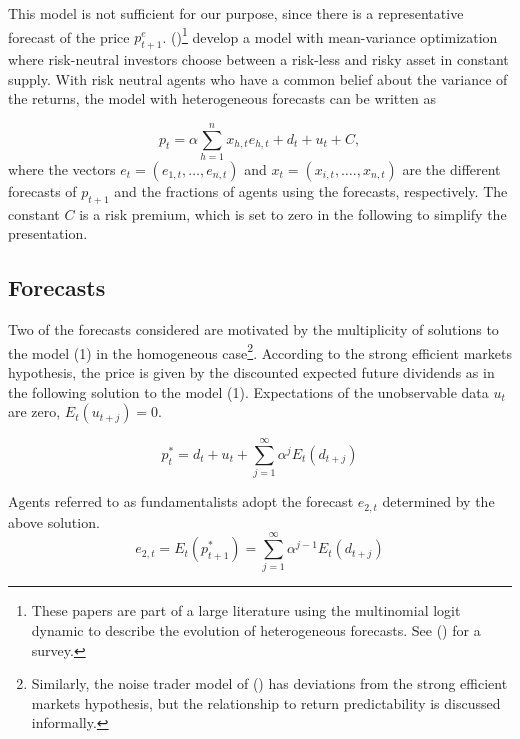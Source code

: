 \documentclass[12pt]{article}
\begin{document}
This model is not sufficient for our purpose, since there is a representative forecast of the price $p_{t+1}^{e}$. \citeauthor{brock1998heterogeneous} (\citeyear{brock1998heterogeneous})\footnote{These papers are part of a large literature using the multinomial logit dynamic to describe the evolution of heterogeneous forecasts. See \citeauthor{hommes2006heterogeneous} (\citeyear{hommes2006heterogeneous}) for a survey.} develop a model with mean-variance optimization where risk-neutral investors choose between a risk-less and risky asset in constant supply. With risk neutral agents who have a common belief about the variance of the returns, the model with heterogeneous forecasts can be written as

\begin{equation}
p_{t}=\alpha \sum_{h=1}^{n} x_{h, t} e_{h, t}+d_{t}+u_{t}+C, \label{p het exp}
\end{equation}
where the vectors $e_{t}=\left(e_{1, t}, \ldots, e_{n, t}\right)$ and $x_{t}=\left(x_{i, t}, \ldots ., x_{n, t}\right)$ are the different forecasts of $p_{t+1}$ and the fractions of agents using the forecasts, respectively. The constant $C$ is a risk premium, which is set to zero in the following to simplify the presentation.

\subsection{Forecasts}

Two of the forecasts considered are motivated by the multiplicity of solutions to the model (1) in the homogeneous case\footnote{Similarly, the noise trader model of \citeauthor{delong1991survival} (\citeyear{delong1991survival}) has deviations from the strong efficient markets hypothesis, but the relationship to return predictability is discussed informally.}. According to the strong efficient markets hypothesis, the price is given by the discounted expected future dividends as in the following solution to the model (1). Expectations of the unobservable data $u_{t}$ are zero, $E_{t}\left(u_{t+j}\right)=0$.

\begin{equation}
p_{t}^{*}=d_{t}+u_{t}+\sum_{j=1}^{\infty} \alpha^{j} E_{t}\left(d_{t+j}\right)
\label{pstar}
\end{equation}

Agents referred to as fundamentalists adopt the forecast $e_{2, t}$ determined by the above solution.
\begin{equation*}
e_{2, t}=E_{t}\left(p_{t+1}^{*}\right)=\sum_{j=1}^{\infty} \alpha^{j-1} E_{t}\left(d_{t+j}\right) \label{e2}
\end{equation*}
\end{document}
